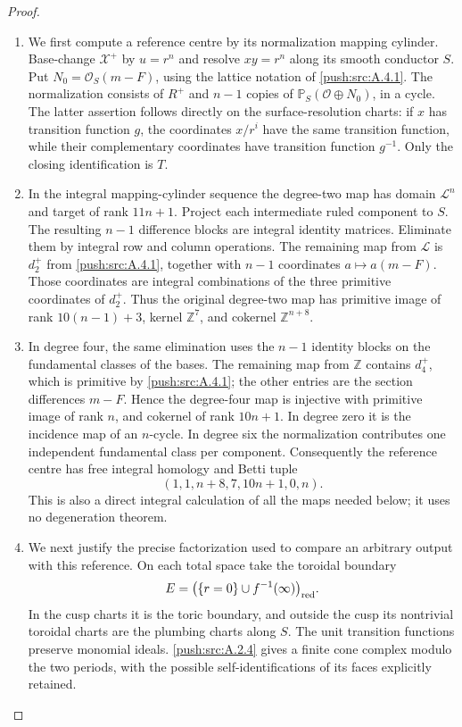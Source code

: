 \begin{proof}
\begin{enumerate}[label=\arabic*.,leftmargin=*]
\item We first compute a reference centre by its normalization
mapping cylinder. Base-change $\mathcal X^+$ by $u=r^n$
and resolve $xy=r^n$ along its smooth conductor $S$.
Put $N_0=\mathcal O_S(m-F)$, using the lattice notation
of \ref{push:src:A.4.1}. The normalization consists of $R^+$ and
$n-1$ copies of $\mathbb P_S(\mathcal O\oplus N_0)$,
in a cycle. The latter assertion follows directly on
the surface-resolution charts: if $x$ has transition
function $g$, the coordinates $x/r^i$ have the same
transition function, while their complementary
coordinates have transition function $g^{-1}$.
Only the closing identification is $T$.

\item In the integral mapping-cylinder sequence the degree-two
map has domain $\mathcal L^n$ and target of rank $11n+1$.
Project each intermediate ruled component to $S$.
The resulting $n-1$ difference blocks are integral
identity matrices. Eliminate them by integral row and
column operations. The remaining map from $\mathcal L$
is $d_2^+$ from \ref{push:src:A.4.1}, together with $n-1$ coordinates
$a\mapsto a(m-F)$. Those coordinates are integral
combinations of the three primitive coordinates of
$d_2^+$. Thus the original degree-two map has primitive
image of rank $10(n-1)+3$, kernel $\mathbb Z^7$, and
cokernel $\mathbb Z^{n+8}$.

\item In degree four, the same elimination uses the $n-1$
identity blocks on the fundamental classes of the bases.
The remaining map from $\mathbb Z$ contains $d_4^+$,
which is primitive by \ref{push:src:A.4.1}; the other entries are the
section differences $m-F$. Hence the degree-four map
is injective with primitive image of rank $n$, and
cokernel of rank $10n+1$. In degree zero it is the
incidence map of an $n$-cycle. In degree six the
normalization contributes one independent fundamental
class per component. Consequently the reference centre
has free integral homology and Betti tuple
\[
 (1,1,n+8,7,10n+1,0,n).
\]
This is also a direct integral calculation of all the
maps needed below; it uses no degeneration theorem.

\item We next justify the precise factorization used to compare
an arbitrary output with this reference. On each total
space take the toroidal boundary
\[
 E=\bigl(\{r=0\}\cup f^{-1}(\infty)\bigr)_{\rm red}.
\]
In the cusp charts it is the toric boundary, and outside
the cusp its nontrivial toroidal charts are the plumbing
charts along $S$. The unit transition functions preserve
monomial ideals. \ref{push:src:A.2.4} gives a finite cone complex modulo
the two periods, with the possible self-identifications
of its faces explicitly retained.


\end{enumerate}
\end{proof}
